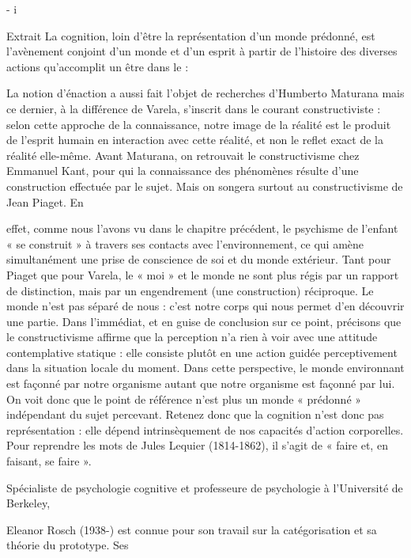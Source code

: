- i 
\begin{lecture}{Extrait}
La cognition, loin d'être la représentation d'un monde prédonné, est l'avènement conjoint d'un monde et d'un esprit à partir de l’histoire des diverses actions qu'accomplit un être dans le : 

 La notion d’énaction a aussi fait l’objet de recherches d’Humberto Maturana mais ce dernier, à la différence de Varela, s’inscrit dans le courant constructiviste : selon cette approche de la connaissance, notre image de la réalité est le produit de l’esprit humain en interaction avec cette réalité, et non le reflet exact de la réalité elle-même. Avant Maturana, on retrouvait le constructivisme chez Emmanuel Kant, pour qui la connaissance des phénomènes résulte d’une construction effectuée par le sujet. Mais on songera surtout au constructivisme de Jean Piaget. En 


effet, comme nous l’avons vu dans le chapitre précédent, le psychisme de l’enfant « se construit » à travers ses contacts avec l’environnement, ce qui amène simultanément une prise de conscience de soi et du monde extérieur. Tant pour Piaget que pour Varela, le « moi » et le monde ne sont plus régis par un rapport de distinction, mais par un engendrement (une construction) réciproque. Le monde n’est pas séparé de nous : c’est notre corps qui nous permet d’en découvrir une partie. Dans l’immédiat, et en guise de conclusion sur ce point, précisons que le constructivisme affirme que la perception n’a rien à voir avec une attitude contemplative statique : elle consiste plutôt en une action guidée perceptivement dans la situation locale du moment. Dans cette perspective, le monde environnant est façonné par notre organisme autant que notre organisme est façonné par lui. On voit donc que le point de référence n’est plus un monde « prédonné » indépendant du sujet percevant. Retenez donc que la cognition n’est donc pas représentation : elle dépend intrinsèquement de nos capacités d’action corporelles. Pour reprendre les mots de Jules Lequier (1814-1862), il s’agit de « faire et, en faisant, se faire ». 


Spécialiste de psychologie cognitive et professeure de psychologie à l’Université de Berkeley, 

Eleanor Rosch (1938-) est connue pour son travail sur la catégorisation et sa théorie du prototype. Ses 


\end{lecture}
